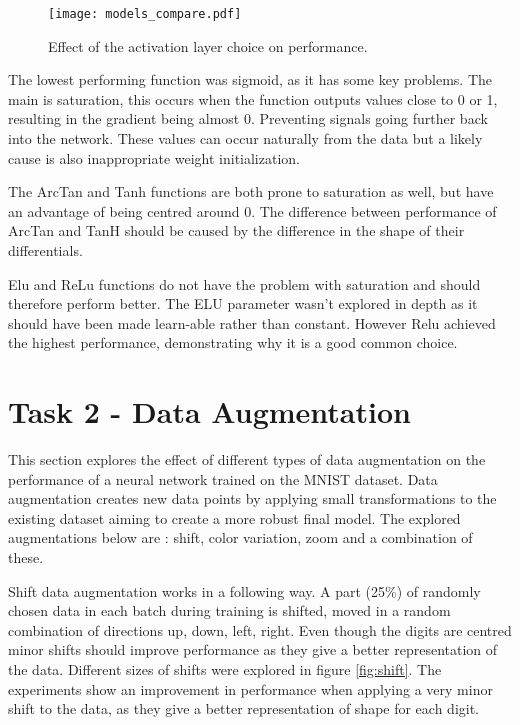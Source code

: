 \documentclass[12pt]{article}
\begin{document}
\begin{figure}[H]
\centering
\texttt{[image: models\_compare.pdf]}

  \caption{Effect of the activation layer choice on performance.}
  \label{fig:models}
\end{figure}

The lowest performing function was sigmoid, as it has some key problems. The main is saturation, this occurs when the function outputs values close to 0 or 1, resulting in the gradient being almost 0. Preventing signals going further back into the network. These values can occur naturally from the data but a likely cause is also inappropriate weight initialization. 

The ArcTan and Tanh functions are both prone to saturation as well, but have an advantage of being centred around 0. The difference between performance of ArcTan and TanH should be caused by the difference in the shape of their differentials.

Elu and ReLu functions do not have the problem with saturation and should therefore perform better. The ELU parameter wasn't explored in depth as it should have been made learn-able rather than constant. However Relu achieved the highest performance, demonstrating why it is a good common choice.

\section*{Task 2 - Data Augmentation}

This section explores the effect of different types of data augmentation on the performance of a neural network trained on the MNIST dataset. Data augmentation creates new data points by applying small transformations to the existing dataset aiming to create a more robust final model. The explored augmentations below are : shift, color variation, zoom and a combination of these. 

Shift data augmentation works in a following way. A part (25\%) of randomly chosen data in each batch during training is shifted, moved in a random combination of directions up, down, left, right. Even though the digits are centred minor shifts should improve performance as they give a better representation of the data. Different sizes of shifts were explored in figure \ref{fig:shift}. The experiments show an improvement in performance when applying a very minor shift to the data, as they give a better representation of shape for each digit.
\end{document}
